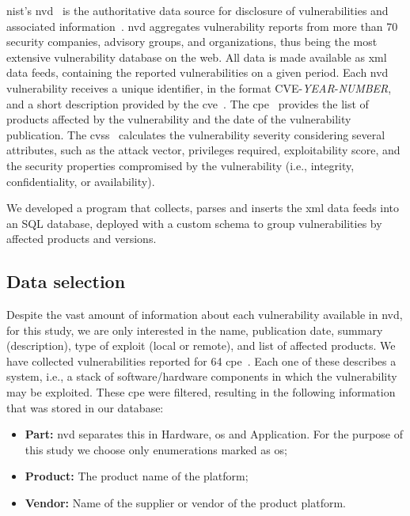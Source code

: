 \gls{nist}'s \gls{nvd}~\cite{nvd} is the authoritative data source for disclosure of vulnerabilities and associated information~\cite{Massacci:2010}. 
\gls{nvd} aggregates vulnerability reports from more than 70 security companies, advisory groups, and organizations, thus being the most extensive vulnerability database on the web. 
All data is made available as \gls{xml} data feeds, containing the reported vulnerabilities on a given period. 
Each \gls{nvd} vulnerability receives a unique identifier, in the format CVE-\textit{YEAR}-\textit{NUMBER}, and a short description provided by the \gls{cve}~\cite{cveterm}. 
The \gls{cpe}~\cite{cpe} provides the list of products affected by the vulnerability and the date of the vulnerability publication.
The \gls{cvss}~\cite{cvss} calculates the vulnerability severity considering several attributes, such as the attack vector, privileges required, exploitability score, and the security properties compromised by the vulnerability (i.e., integrity, confidentiality, or availability).


We developed a program that collects, parses and inserts the \gls{xml} data feeds into an SQL database, deployed with a custom schema to group vulnerabilities by affected products and versions.

\subsection{Data selection}
Despite the vast amount of information about each vulnerability available in \gls{nvd}, for this study, we are only interested in the name, publication date, summary (description), type of exploit (local or remote), and list of affected products.
We have collected vulnerabilities reported for 64 \gls{cpe}~\cite{cpe}.
Each one of these describes a system, i.e., a stack of software/hardware components in which the vulnerability may be exploited.
These \gls{cpe} were filtered, resulting in the following information that was stored in our database:

\begin{itemize}
\item \textbf{Part:} \gls{nvd} separates this in Hardware, \gls{os} and Application. For the purpose of this study we choose only enumerations marked as \gls{os};
\item \textbf{Product:} The product name of the platform;
\item \textbf{Vendor:} Name of the supplier or vendor of the product platform.
\end{itemize}


